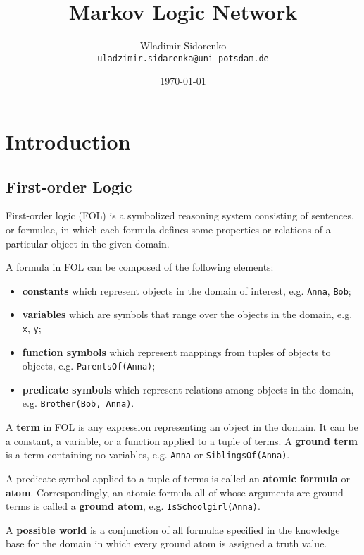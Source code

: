 \documentclass{beamer}
\title[]{Markov Logic Network}
\author[Sidorenko]{Wladimir Sidorenko\\ \texttt{uladzimir.sidarenka{@}uni-potsdam.de}}
\institute{University of Potsdam}
\date{\today}
\begin{document}
\begin{frame}{}
  \titlepage
\end{frame}

\section{Introduction}
\subsection{First-order Logic}
\begin{frame}{\insertsubsection}
  \begin{definition}
    First-order logic (FOL) is a symbolized reasoning system
    consisting of sentences, or formulae, in which each formula
    defines some properties or relations of a particular object in the
    given domain.
  \end{definition}
  A formula in FOL can be composed of the following elements:
  \begin{itemize}
    \item \textbf{constants} which represent objects in the domain of
      interest, e.g. \texttt{Anna}, \texttt{Bob};
    \item \textbf{variables} which are symbols that range over the
      objects in the domain, e.g. \texttt{x}, \texttt{y};
    \item \textbf{function symbols} which represent mappings from
      tuples of objects to objects, e.g. \texttt{ParentsOf(Anna)};
    \item \textbf{predicate symbols} which represent relations among
      objects in the domain, e.g. \texttt{Brother(Bob, Anna)}.
  \end{itemize}
\end{frame}

\begin{frame}{\insertsubsection}
A \textbf{term} in FOL is any expression representing an object in the
domain. It can be a constant, a variable, or a function applied to a
tuple of terms.  A \textbf{ground term} is a term containing no
variables, e.g. \texttt{Anna} or \texttt{SiblingsOf(Anna)}.\vspace{0.5cm}

A predicate symbol applied to a tuple of terms is called an
\textbf{atomic formula} or \textbf{atom}.  Correspondingly, an atomic
formula all of whose arguments are ground terms is called a
\textbf{ground atom}, e.g. \texttt{IsSchoolgirl(Anna)}.\vspace{0.5cm}

A \textbf{possible world} is a conjunction of all formulae specified
in the knowledge base for the domain in which every ground atom is
assigned a truth value.
\end{frame}
\end{document}
